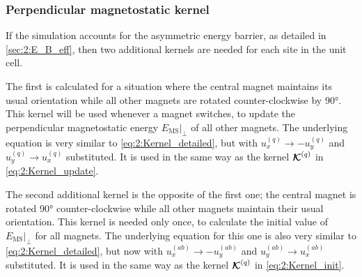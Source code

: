 \subsubsection{Perpendicular magnetostatic kernel} %
If the simulation accounts for the asymmetric energy barrier, as detailed in \cref{sec:2:E_B_eff}, then two additional kernels are needed for each site in the unit cell. \par
The first is calculated for a situation where the central magnet maintains its usual orientation while all other magnets are rotated counter-clockwise by \ang{90}.
This kernel will be used whenever a magnet switches, to update the perpendicular magnetostatic energy $\left. E_{\mathrm{MS}} \right|_{\perp}$ of all other magnets.
The underlying equation is very similar to \cref{eq:2:Kernel_detailed}, but with $u_x^{(q)} \rightarrow -u_y^{(q)}$ and $u_y^{(q)} \rightarrow u_x^{(q)}$ substituted.
It is used in the same way as the kernel $\boldsymbol{\mathbf{\mathcal{K}}}^{(q)}$ in \cref{eq:2:Kernel_update}. \par
The second additional kernel is the opposite of the first one; the central magnet is rotated \ang{90} counter-clockwise while all other magnets maintain their usual orientation.
This kernel is needed only once, to calculate the initial value of $\left. E_{\mathrm{MS}} \right|_{\perp}$ for all magnets.
The underlying equation for this one is also very similar to \cref{eq:2:Kernel_detailed}, but now with $u_x^{(ab)} \rightarrow -u_y^{(ab)}$ and $u_y^{(ab)} \rightarrow u_x^{(ab)}$ substituted.
It is used in the same way as the kernel $\boldsymbol{\mathbf{\mathcal{K}}}^{(q)}$ in \cref{eq:2:Kernel_init}.

